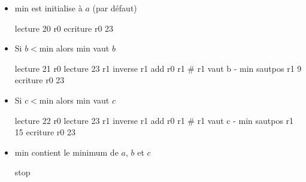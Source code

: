\begin{enumerate}
\begin{correction}
\begin{itemize}
\begin{listing}{20}
12 # a    
23 # b
6  # c
?  # min
\end{listing}
\item $\text{min}$ est initialise à $a$ (par défaut)
\begin{listing}{1}
lecture 20 r0
ecriture r0 23
\end{listing}
\item Si $b < \text{min}$ alors $\text{min}$ vaut $b$
\begin{listing}{3}
lecture 21 r0
lecture 23 r1
inverse r1
add r0 r1    # r1 vaut b - min
sautpos r1 9 
ecriture r0 23
\end{listing}
\item Si $c < \text{min}$ alors $\text{min}$ vaut $c$
\begin{listing}{9}
lecture 22 r0
lecture 23 r1
inverse r1
add r0 r1 # r1 vaut c - min
sautpos r1 15
ecriture r0 23
\end{listing}
\item $\text{min}$ contient le minimum de $a$, $b$ et $c$ 
\begin{listing}{15}
stop
\end{listing}
\end{itemize}
\end{correction}
\end{enumerate}

